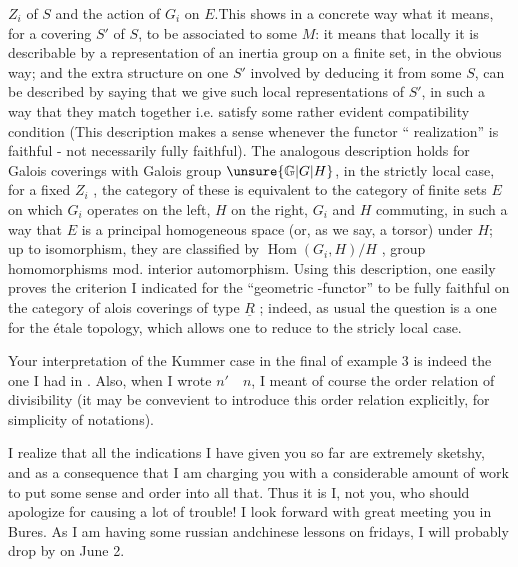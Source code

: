 $Z_i$ of $S$ and the action of $G_i$ on $E$.This shows in a  concrete way what it means,  for a covering $S'$ of $S$, to be associated to some $M$: it means that locally it is describable by a representation of an inertia group on a finite set, in the obvious way; and the extra structure on one $S'$ involved by deducing it from some $S$, can be described by saying that we give such local representations of $S'$, in such a way that they match together i.e. satisfy some rather evident compatibility condition (This description makes a sense whenever the functor `` realization'' is faithful - not necessarily fully faithful). The analogous description holds for Galois coverings with Galois group $\unsure{\mathbb{G}|G|H}$,  in the strictly local case, for a fixed $Z_i$ , the category of these is equivalent to the category of finite sets $E$ on which $G_i$ operates on the left, $H$ on the right, $G_i$ and $H$ commuting, in such a way that $E$ is a principal homogeneous space (or, as we say, a torsor) under $H$; up to isomorphism, they are classified by $\operatorname{Hom}(G_i,H)/H$ , group homomorphisms mod. interior automorphism. Using  this description, one easily proves the criterion I indicated for the ``geometric -functor'' to be fully faithful on the category of alois coverings of type $\underline{R}$ ; indeed, as usual the question is a  one for the étale topology, which allows one to  reduce to the stricly local case.

Your interpretation of the Kummer case in the final  of example 3 is indeed the one I had in . Also, when I wrote $n'\quad n$, I meant of course the order relation of divisibility (it may be convevient to introduce this order relation explicitly, for simplicity of notations).

I realize that all the indications I have given you so far are extremely sketshy, and as a consequence that I am charging you with a considerable amount of work to put some sense and order into all that. Thus it is I, not you, who should apologize for causing a lot of trouble! I look forward with great  meeting you in Bures. As I am having some russian andchinese lessons on fridays, I will probably drop by on June 2.

